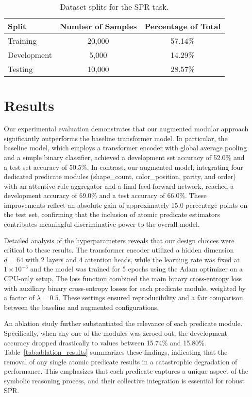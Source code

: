 \documentclass{article}
\begin{document}
\begin{table}[htb]
\centering
\begin{tabular}{lcc}
\hline
Split      & Number of Samples & Percentage of Total \\\hline
Training   & 20,000            & 57.14\% \\
Development& 5,000             & 14.29\% \\
Testing    & 10,000            & 28.57\% \\\hline
\end{tabular}
\caption{Dataset splits for the SPR task.}
\label{tab:dataset}
\end{table}

\section{Results}
Our experimental evaluation demonstrates that our augmented modular approach significantly outperforms the baseline transformer model. In particular, the baseline model, which employs a transformer encoder with global average pooling and a simple binary classifier, achieved a development set accuracy of 52.0\% and a test set accuracy of 50.5\%. In contrast, our augmented model, integrating four dedicated predicate modules (shape\_count, color\_position, parity, and order) with an attentive rule aggregator and a final feed-forward network, reached a development accuracy of 69.0\% and a test accuracy of 66.0\%. These improvements reflect an absolute gain of approximately 15.0 percentage points on the test set, confirming that the inclusion of atomic predicate estimators contributes meaningful discriminative power to the overall model.

Detailed analysis of the hyperparameters reveals that our design choices were critical to these results. The transformer encoder utilized a hidden dimension \(d = 64\) with 2 layers and 4 attention heads, while the learning rate was fixed at \(1 \times 10^{-3}\) and the model was trained for 5 epochs using the Adam optimizer on a CPU-only setup. The loss function combined the main binary cross-entropy loss with auxiliary binary cross-entropy losses for each predicate module, weighted by a factor of \(\lambda = 0.5\). These settings ensured reproducibility and a fair comparison between the baseline and augmented configurations.

An ablation study further substantiated the relevance of each predicate module. Specifically, when any one of the modules was zeroed out, the development accuracy dropped drastically to values between 15.74\% and 15.80\%. Table~\ref{tab:ablation_results} summarizes these findings, indicating that the removal of any single atomic predicate results in a catastrophic degradation of performance. This emphasizes that each predicate captures a unique aspect of the symbolic reasoning process, and their collective integration is essential for robust SPR.
\end{document}
